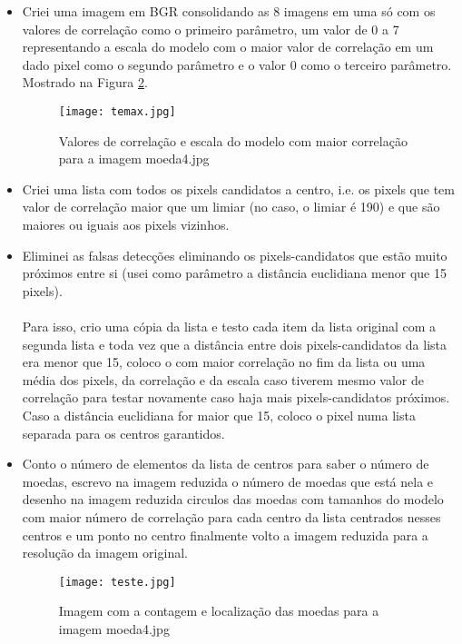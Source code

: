\documentclass[titlepage,12pt,a4paper]{article}
\begin{document}
\begin{itemize}
        \item Criei uma imagem em BGR consolidando as 8 imagens em uma só com os valores de correlação como o primeiro parâmetro, um valor de 0 a 7 representando a escala do modelo com o maior valor de correlação em um dado pixel como o segundo parâmetro e o valor 0 como o terceiro parâmetro. Mostrado na Figura \ref{fig:fig2}.
        \begin{figure}[H]
            \centering
            \texttt{[image: temax.jpg]}
            \caption{\footnotesize Valores de correlação e escala do modelo com maior correlação para a imagem moeda4.jpg}
            \label{fig:fig2}
        \end{figure}
        \item Criei uma lista com todos os pixels candidatos a centro, i.e. os pixels que tem valor de correlação maior que um limiar (no caso, o limiar é 190) e que são maiores ou iguais aos pixels vizinhos.
        \item Eliminei as falsas detecções eliminando os pixels-candidatos que estão muito próximos entre si (usei como parâmetro a distância euclidiana menor que 15 pixels).\\\\
        Para isso, crio uma cópia da lista e testo cada item da lista original com a segunda lista e toda vez que a distância entre dois pixels-candidatos da lista era menor que 15, coloco o com maior correlação no fim da lista ou uma média dos pixels, da correlação e da escala caso tiverem mesmo valor de correlação para testar novamente caso haja mais pixels-candidatos próximos. Caso a distância euclidiana for maior que 15, coloco o pixel numa lista separada para os centros garantidos.
        \item Conto o número de elementos da lista de centros para saber o número de moedas, escrevo na imagem reduzida o número de moedas que está nela e desenho na imagem reduzida circulos das moedas com tamanhos do modelo com maior número de correlação para cada centro da lista centrados nesses centros e um ponto no centro finalmente volto a imagem reduzida para a resolução da imagem original.
        \begin{figure}[H]
            \centering
            \texttt{[image: teste.jpg]}
            \caption{\footnotesize Imagem com a contagem e localização das moedas para a imagem moeda4.jpg}
            \label{fig:fig2}
        \end{figure}
    \end{itemize}
    \begin{lstlisting}
    \end{lstlisting}
\end{document}
